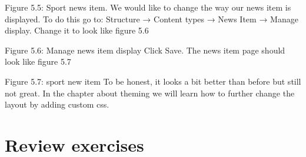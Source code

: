 Figure 5.5: Sport news item.
We would like to change the way our news item is displayed. To do this go to: Structure → Content types → News Item → Manage display. Change it to look like figure 5.6









Figure 5.6: Manage news item display
Click Save. The news item page should look like figure 5.7

Figure 5.7: sport new item
To be honest, it looks a bit better than before but still not great. In the chapter about theming we will learn how to further change the layout by adding custom css.

\section{Review exercises}

